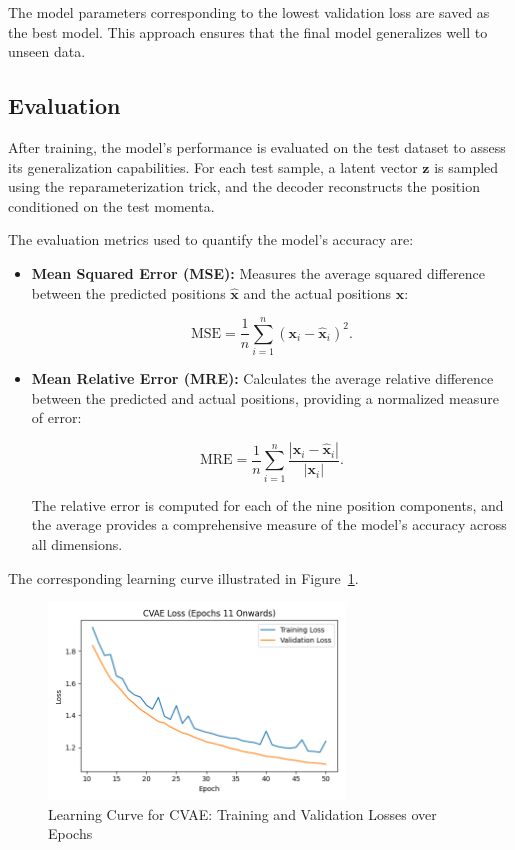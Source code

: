 \documentclass[11pt]{paper}
\begin{document}
The model parameters corresponding to the lowest validation loss are saved as the best model. This approach ensures that the final model generalizes well to unseen data.

\subsection{Evaluation}
\label{sec:Metrics}
After training, the model's performance is evaluated on the test dataset to assess its generalization capabilities. For each test sample, a latent vector $\mathbf{z}$ is sampled using the reparameterization trick, and the decoder reconstructs the position conditioned on the test momenta.

The evaluation metrics used to quantify the model's accuracy are:

\begin{itemize}
    \item \textbf{Mean Squared Error (MSE):} Measures the average squared difference between the predicted positions $\mathbf{\hat{x}}$ and the actual positions $\mathbf{x}$:

    \begin{equation}
    \text{MSE} = \frac{1}{n} \sum_{i=1}^{n} \left( \mathbf{x}_i - \mathbf{\hat{x}}_i \right)^2.
    \label{eq:mse}
    \end{equation}

    \item \textbf{Mean Relative Error (MRE):} Calculates the average relative difference between the predicted and actual positions, providing a normalized measure of error:

    \begin{equation}
    \text{MRE} = \frac{1}{n} \sum_{i=1}^{n} \frac{ \left| \mathbf{x}_i - \mathbf{\hat{x}}_i \right| }{ \left| \mathbf{x}_i \right| }.
    \label{eq:mre}
    \end{equation}

    The relative error is computed for each of the nine position components, and the average provides a comprehensive measure of the model's accuracy across all dimensions.
\end{itemize}

The corresponding learning curve illustrated in Figure~\ref{fig:cvae_lc}.

\begin{figure}[H]
    \centering
    \includegraphics[width=0.7\textwidth]{cvae_lc.png}
    \caption{Learning Curve for CVAE: Training and Validation Losses over Epochs}
    \label{fig:cvae_lc}
\end{figure}
\end{document}
